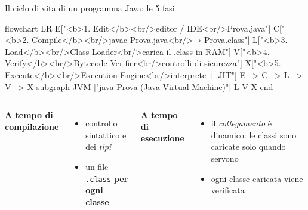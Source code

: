 \documentclass[10pt,aspectratio=169]{beamer}
\begin{document}
\begin{frame}[fragile]{Il ciclo di vita di un programma Java: le 5 fasi}
\begin{mermaid}
flowchart LR
  E["<b>1. Edit</b><br/>editor / IDE<br/>Prova.java"]
  C["<b>2. Compile</b><br/>javac Prova.java<br/>→ Prova.class"]
  L["<b>3. Load</b><br/>Class Loader<br/>carica il .class in RAM"]
  V["<b>4. Verify</b><br/>Bytecode Verifier<br/>controlli di sicurezza"]
  X["<b>5. Execute</b><br/>Execution Engine<br/>interprete + JIT"]
  E --> C --> L --> V --> X
  subgraph JVM ["java Prova  (Java Virtual Machine)"]
    L
    V
    X
  end
\end{mermaid}

\vspace{0.3cm}
\begin{columns}[T]
\textbf{A tempo di compilazione}
\begin{itemize}\itemsep=0pt
    \item controllo sintattico e dei \emph{tipi}
    \item un file \texttt{.class} \textbf{per ogni classe}
\end{itemize}
\textbf{A tempo di esecuzione}
\begin{itemize}\itemsep=0pt
    \item il \emph{collegamento} è dinamico: le classi sono caricate solo quando servono
    \item ogni classe caricata viene verificata
\end{itemize}
\end{columns}
\end{frame}
\end{document}
